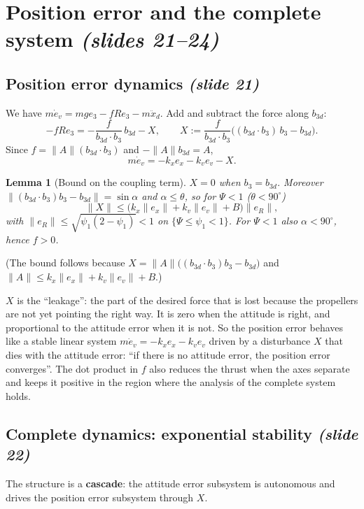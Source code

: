 \documentclass[11pt,a4paper]{article}
\newcommand{\eR}{e_R}
\newcommand{\ex}{e_x}
\newcommand{\ev}{e_v}
\newcommand{\sli}[1]{\emph{(#1)}}
\theoremstyle{definition}
\theoremstyle{plain}
\newtheorem{lemma}[definition]{Lemma}
\theoremstyle{remark}
\begin{document}
\section{Position error and the complete system \sli{slides 21--24}}

\subsection{Position error dynamics \sli{slide 21}}

We have $m\dot\ev=mge_3-fRe_3-m\ddot x_d$. Add and subtract the force along $b_{3d}$:
\[
-fRe_3=-\frac f{b_{3d}\cdot b_3}\,b_{3d}-X,\qquad X:=\frac f{b_{3d}\cdot b_3}\Big((b_{3d}\cdot b_3)\,b_3-b_{3d}\Big).
\]
Since $f=\|A\|(b_{3d}\cdot b_3)$ and $-\|A\|b_{3d}=A$,
\[
\boxed{m\dot\ev=-k_x\ex-k_v\ev-X}.
\]

\begin{lemma}[Bound on the coupling term]
$X=0$ when $b_3=b_{3d}$. Moreover $\|(b_{3d}\cdot b_3)b_3-b_{3d}\|=\sin\alpha$ and $\alpha\le\theta$, so for $\Psi<1$ ($\theta<90^\circ$)
\[
\|X\|\le\big(k_x\|\ex\|+k_v\|\ev\|+B\big)\|\eR\|,
\]
with $\|\eR\|\le\sqrt{\psi_1(2-\psi_1)}<1$ on $\{\Psi\le\psi_1<1\}$. For $\Psi<1$ also $\alpha<90^\circ$, hence $f>0$.
\end{lemma}

(The bound follows because $X=\|A\|\big((b_{3d}\cdot b_3)b_3-b_{3d}\big)$ and $\|A\|\le k_x\|\ex\|+k_v\|\ev\|+B$.)

\begin{intuition}
$X$ is the ``leakage'': the part of the desired force that is lost because the propellers are not yet pointing the right way. It is zero when the attitude is right, and proportional to the attitude error when it is not. So the position error behaves like a stable linear system $m\dot\ev=-k_x\ex-k_v\ev$ driven by a disturbance $X$ that dies with the attitude error: ``if there is no attitude error, the position error converges''. The dot product in $f$ also reduces the thrust when the axes separate and keeps it positive in the region where the analysis of the complete system holds.
\end{intuition}

\subsection{Complete dynamics: exponential stability \sli{slide 22}}

The structure is a \textbf{cascade}: the attitude error subsystem is autonomous and drives the position error subsystem through $X$.
\end{document}
